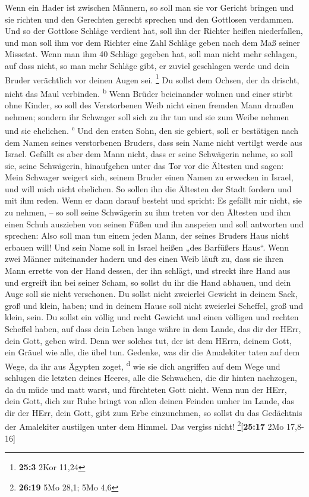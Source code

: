  Wenn ein Hader ist zwischen Männern, so soll man sie vor
Gericht bringen und sie richten und den Gerechten gerecht sprechen und
den Gottlosen verdammen.  Und so der Gottlose Schläge
verdient hat, soll ihn der Richter heißen niederfallen, und man soll ihm
vor dem Richter eine Zahl Schläge geben nach dem Maß seiner Missetat.
 Wenn man ihm 40 Schläge gegeben hat, soll man nicht mehr
schlagen, auf dass nicht, so man mehr Schläge gibt, er zuviel geschlagen
werde und dein Bruder verächtlich vor deinen Augen sei. \footnote{\textbf{25:3}
  2Kor 11,24}  Du sollst dem Ochsen, der da drischt, nicht
das Maul verbinden. \textsuperscript{b}  Wenn Brüder
beieinander wohnen und einer stirbt ohne Kinder, so soll des
Verstorbenen Weib nicht einen fremden Mann draußen nehmen; sondern ihr
Schwager soll sich zu ihr tun und sie zum Weibe nehmen und sie
ehelichen. \textsuperscript{c}  Und den ersten Sohn, den
sie gebiert, soll er bestätigen nach dem Namen seines verstorbenen
Bruders, dass sein Name nicht vertilgt werde aus Israel. 
Gefällt es aber dem Mann nicht, dass er seine Schwägerin nehme, so soll
sie, seine Schwägerin, hinaufgehen unter das Tor vor die Ältesten und
sagen: Mein Schwager weigert sich, seinem Bruder einen Namen zu erwecken
in Israel, und will mich nicht ehelichen.  So sollen ihn
die Ältesten der Stadt fordern und mit ihm reden. Wenn er dann darauf
besteht und spricht: Es gefällt mir nicht, sie zu nehmen, --
 so soll seine Schwägerin zu ihm treten vor den Ältesten
und ihm einen Schuh ausziehen von seinen Füßen und ihn anspeien und soll
antworten und sprechen: Also soll man tun einem jeden Mann, der seines
Bruders Haus nicht erbauen will!  Und sein Name soll in
Israel heißen „des Barfüßers Haus``.  Wenn zwei Männer
miteinander hadern und des einen Weib läuft zu, dass sie ihren Mann
errette von der Hand dessen, der ihn schlägt, und streckt ihre Hand aus
und ergreift ihn bei seiner Scham,  so sollst du ihr die
Hand abhauen, und dein Auge soll sie nicht verschonen. 
Du sollst nicht zweierlei Gewicht in deinem Sack, groß und klein, haben;
 und in deinem Hause soll nicht zweierlei Scheffel, groß
und klein, sein.  Du sollst ein völlig und recht Gewicht
und einen völligen und rechten Scheffel haben, auf dass dein Leben lange
währe in dem Lande, das dir der HErr, dein Gott, geben wird.
 Denn wer solches tut, der ist dem HErrn, deinem Gott,
ein Gräuel wie alle, die übel tun.  Gedenke, was dir die
Amalekiter taten auf dem Wege, da ihr aus Ägypten zoget,
\textsuperscript{d}  wie sie dich angriffen auf dem Wege
und schlugen die letzten deines Heeres, alle die Schwachen, die dir
hinten nachzogen, da du müde und matt warst, und fürchteten Gott nicht.
 Wenn nun der HErr, dein Gott, dich zur Ruhe bringt von
allen deinen Feinden umher im Lande, das dir der HErr, dein Gott, gibt
zum Erbe einzunehmen, so sollst du das Gedächtnis der Amalekiter
austilgen unter dem Himmel. Das vergiss nicht!
\footnote{\textbf{26:19} 5Mo 28,1; 5Mo 4,6}{[}\textbf{25:17} 2Mo
17,8-16{]}

